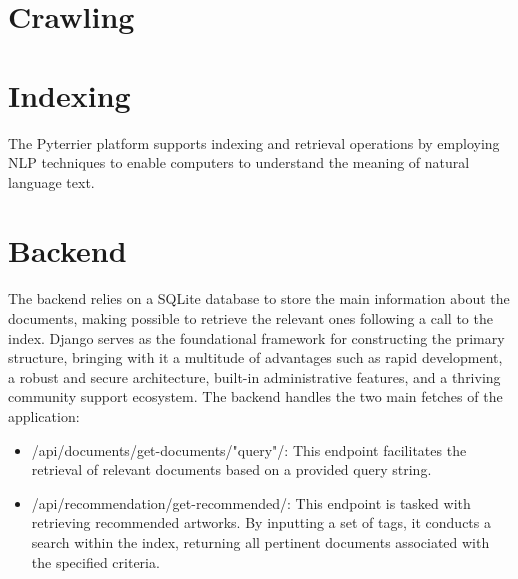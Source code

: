 \documentclass[12pt]{spieman}  %
\begin{document}
\begin{spacing}{1}
    \section{Crawling}\label{sec:crawling}

    \section{Indexing}\label{sec:indexing}
    The Pyterrier platform supports indexing and retrieval operations by employing NLP techniques
    to enable computers to understand the meaning of natural language text.

    \section{Backend}
    The backend relies on a SQLite database to store the main information about the documents, making possible to retrieve the relevant ones following a call to the index.\newline
    Django serves as the foundational framework for constructing the primary structure, bringing with it a multitude of advantages such as rapid development, a robust and secure architecture, built-in administrative features, and a thriving community support ecosystem.\newline
    The backend handles the two main fetches of the application:
    \begin{itemize}
        \item /api/documents/get-documents/"query"/: This endpoint facilitates the retrieval of relevant documents based on a provided query string.
        \item /api/recommendation/get-recommended/: This endpoint is tasked with retrieving recommended artworks. By inputting a set of tags, it conducts a search within the index, returning all pertinent documents associated with the specified criteria.
    \end{itemize}


\end{spacing}
\end{document}
